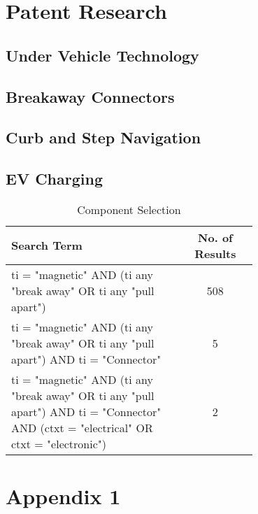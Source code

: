 \documentclass [12pt]{article}
\begin{document}
\section{Patent Research}\label{sec:patent_research}
\subsection{Under Vehicle Technology}\label{sec:under_vehilce_technology}
\subsection{Breakaway Connectors}\label{sec:breakaway_connectors}
\subsection{Curb and Step Navigation}\label{sec:curb_step_navigation}
\subsection{EV Charging}\label{sec:ev_charging}



\begin{table}[H]
\centering
\setlength{\arrayrulewidth}{1.5pt}
\begin{tabular}{|p{0.7\linewidth}|c|}
\hline
\cellcolor{gray!40}Search Term & \cellcolor{gray!40}No. of Results \\
\hline
ti = "magnetic" AND (ti any "break away" OR ti any "pull apart") & 508 \\
\hline
ti = "magnetic" AND (ti any "break away" OR ti any "pull apart") AND ti = "Connector"  & 5 \\
\hline
ti = "magnetic" AND (ti any "break away" OR ti any "pull apart") AND ti = "Connector" AND (ctxt = "electrical" OR ctxt = "electronic") & 2 \\
\hline
\end{tabular}
\caption{Component Selection}
\label{table:search_terms_1}
\end{table}


% 
% 

\newpage
\appendix

\section{Appendix 1}\label{app:appendix_1}
\end{document}
